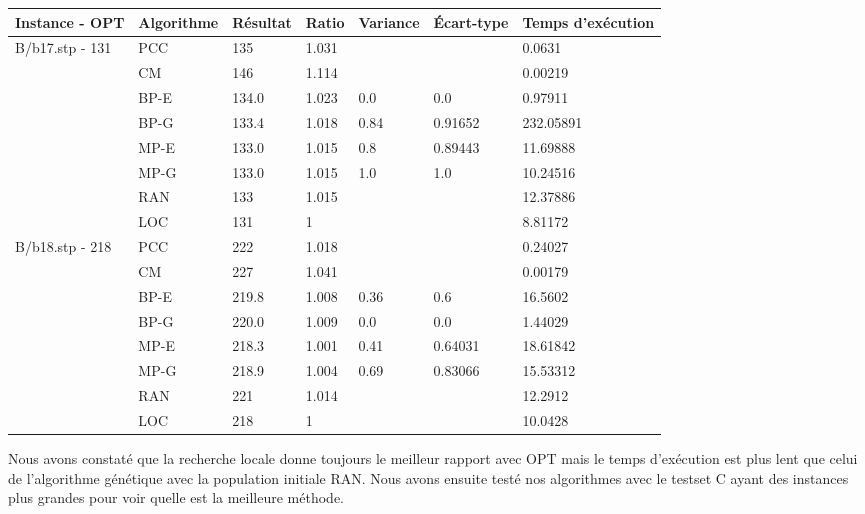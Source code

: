 \documentclass[12pt,a4paper]{article}
\begin{document}
\begin{center}
	\begin{tabular}{l|l|l|l|l|l|l}
		Instance - OPT & Algorithme & Résultat & Ratio & Variance & Écart-type & Temps d'exécution\\ \hline \hline
		B/b17.stp - 131&PCC&135&1.031&&&0.0631\\
		&CM&146&1.114&&&0.00219\\
		&BP-E&134.0&1.023&0.0&0.0&0.97911\\
		&BP-G&133.4&1.018&0.84&0.91652&232.05891\\
		&MP-E&133.0&1.015&0.8&0.89443&11.69888\\
		&MP-G&133.0&1.015&1.0&1.0&10.24516\\
		&RAN&133&1.015&&&12.37886\\
		&LOC&131&1&&&8.81172\\\hline
		B/b18.stp - 218&PCC&222&1.018&&&0.24027\\
		&CM&227&1.041&&&0.00179\\
		&BP-E&219.8&1.008&0.36&0.6&16.5602\\
		&BP-G&220.0&1.009&0.0&0.0&1.44029\\
		&MP-E&218.3&1.001&0.41&0.64031&18.61842\\
		&MP-G&218.9&1.004&0.69&0.83066&15.53312\\
		&RAN&221&1.014&&&12.2912\\
		&LOC&218&1&&&10.0428\\\hline
	\end{tabular}
\end{center}
Nous avons constaté que la recherche locale donne toujours le meilleur rapport avec OPT mais le temps d'exécution est plus lent que celui de l'algorithme génétique avec la population initiale RAN. Nous avons ensuite testé nos algorithmes avec le testset C ayant des instances plus grandes pour voir quelle est la meilleure méthode.
\end{document}
